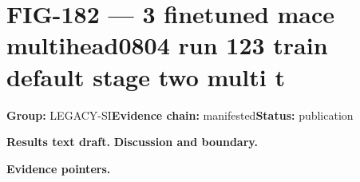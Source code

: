 \clearpage
\section{FIG-182 --- 3 finetuned mace multihead0804 run 123 train default stage two multi t}
\label{figpage:fig-182}
\textbf{Group:} LEGACY-SI\quad \textbf{Evidence chain:} manifested\quad \textbf{Status:} publication

\textbf{Results text draft.} 
\textbf{Discussion and boundary.} 


\textbf{Evidence pointers.}



\vfill
